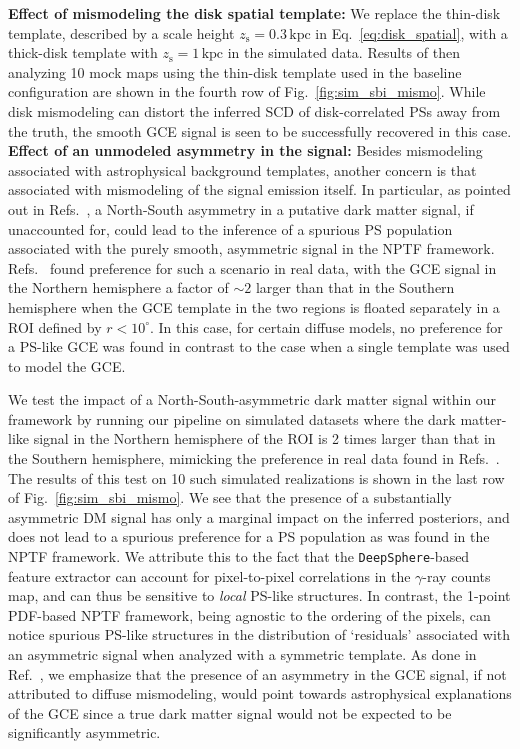 \documentclass[prd,aps,10pt,nofootinbib,twocolumn,superscriptaddress,preprintnumbers,balancelastpage,longbibliography]{revtex4-1}
\begin{document}
\noindent
\textbf{Effect of mismodeling the disk spatial template:} 
We replace the thin-disk template, described by a scale height $z_\mathrm{s} = 0.3\,\mathrm{kpc}$ in Eq.~\eqref{eq:disk_spatial}, with a thick-disk template with $z_\mathrm{s} = 1\,\mathrm{kpc}$ in the simulated data. Results of then analyzing 10 mock maps using the thin-disk template used in the baseline configuration are shown in the fourth row of Fig.~\ref{fig:sim_sbi_mismo}. While disk mismodeling can distort the inferred SCD of disk-correlated PSs away from the truth, the smooth GCE signal is seen to be successfully recovered in this case. \\

\noindent
\textbf{Effect of an unmodeled asymmetry in the signal:}
Besides mismodeling associated with astrophysical background templates, another concern is that associated with mismodeling of the signal emission itself. In particular, as pointed out in Refs.~\cite{Leane:2020nmi,Leane:2020pfc}, a North-South asymmetry in a putative dark matter signal, if unaccounted for, could lead to the inference of a spurious PS population associated with the purely smooth, asymmetric signal in the NPTF framework. Refs.~\cite{Leane:2020nmi,Leane:2020pfc} found preference for such a scenario in real \Fermi data, with the GCE signal in the Northern hemisphere a factor of $\sim2$ larger than that in the Southern hemisphere when the GCE template in the two regions is floated separately in a ROI defined by $r < 10^\circ$. In this case, for certain diffuse models, no preference for a PS-like GCE was found in contrast to the case when a single template was used to model the GCE. 

We test the impact of a North-South-asymmetric dark matter signal within our framework by running our pipeline on simulated datasets where the dark matter-like signal in the Northern hemisphere of the ROI is 2 times larger than that in the Southern hemisphere, mimicking the preference in real data found in Refs.~\cite{Leane:2020nmi,Leane:2020pfc}. The results of this test on 10 such simulated realizations is shown in the last row of Fig.~\ref{fig:sim_sbi_mismo}. We see that the presence of a substantially asymmetric DM signal has only a marginal impact on the inferred posteriors, and does not lead to a spurious preference for a PS population as was found in the NPTF framework. We attribute this to the fact that the \texttt{DeepSphere}-based feature extractor can account for pixel-to-pixel correlations in the $\gamma$-ray counts map, and can thus be sensitive to \emph{local} PS-like structures. In contrast, the 1-point PDF-based NPTF framework, being agnostic to the ordering of the pixels, can notice spurious PS-like structures in the distribution of `residuals' associated with an asymmetric signal when analyzed with a symmetric template.
As done in Ref.~\cite{Buschmann:2020adf}, we emphasize that the presence of an asymmetry in the GCE signal, if not attributed to diffuse mismodeling, would point towards astrophysical explanations of the GCE since a true dark matter signal would not be expected to be significantly asymmetric.
\end{document}
